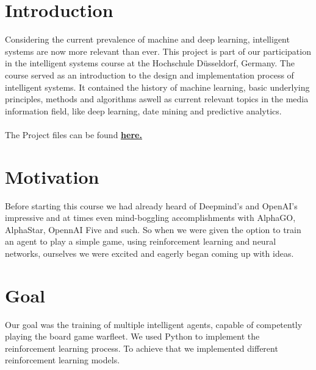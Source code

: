 \documentclass[sigconf]{acmart}
\begin{document}

\maketitle 
\pagestyle{plain}

\section{Introduction}
Considering the current prevalence of machine and deep learning, intelligent systems are now more relevant than ever.
This project is part of our participation in the intelligent systems course at the Hochschule Düsseldorf, Germany. The course served as an introduction to the design and implementation process of intelligent systems. It contained the history of machine learning, basic underlying principles, methods and algorithms aswell as current relevant topics in the media information field, like deep learning, date mining and predictive analytics. \\
\\
The Project files can be found \href{https://github.com/mickey175/Trained_Warfleet}{\textbf{\underline{here.}}} 

\section{Motivation}
Before starting this course we had already heard of Deepmind's and OpenAI's impressive and at times even mind-boggling accomplishments with AlphaGO, AlphaStar, OpennAI Five and such. So when we were given the option to train an agent to play a simple game, using reinforcement learning and neural networks, ourselves we were excited and eagerly began coming up with ideas.

\section{Goal}
Our goal was the training of multiple intelligent agents, capable of competently playing the board game warfleet. 
We used Python to implement the reinforcement learning process. 
To achieve that we implemented different reinforcement learning models. 
\end{document}
